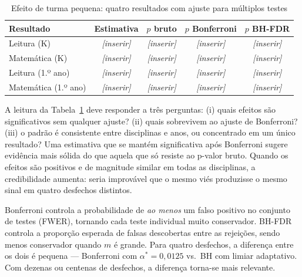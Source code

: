 \begin{table}[H]
\centering
\caption{Efeito de turma pequena: quatro resultados com ajuste para múltiplos testes}
\label{tab:multiplos_testes_star}
\begin{tabular}{lcccc}
\toprule
Resultado & Estimativa & $p$ bruto & $p$ Bonferroni & $p$ BH-FDR \\
\midrule
Leitura (K)          & \textit{[inserir]} & \textit{[inserir]} & \textit{[inserir]} & \textit{[inserir]} \\
Matemática (K)       & \textit{[inserir]} & \textit{[inserir]} & \textit{[inserir]} & \textit{[inserir]} \\
Leitura (1.º ano)    & \textit{[inserir]} & \textit{[inserir]} & \textit{[inserir]} & \textit{[inserir]} \\
Matemática (1.º ano) & \textit{[inserir]} & \textit{[inserir]} & \textit{[inserir]} & \textit{[inserir]} \\
\bottomrule
\end{tabular}

\vspace{4pt}
\end{table}

A leitura da Tabela~\ref{tab:multiplos_testes_star} deve responder a três perguntas: (i) quais efeitos são significativos sem qualquer ajuste? (ii) quais sobrevivem ao ajuste de Bonferroni? (iii) o padrão é consistente entre disciplinas e anos, ou concentrado em um único resultado? Uma estimativa que se mantém significativa após Bonferroni sugere evidência mais sólida do que aquela que só resiste ao p-valor bruto. Quando os efeitos são positivos e de magnitude similar em todas as disciplinas, a credibilidade aumenta: seria improvável que o mesmo viés produzisse o mesmo sinal em quatro desfechos distintos.

\begin{notabox}
Bonferroni controla a probabilidade de \textit{ao menos} um falso positivo no conjunto de testes (FWER), tornando cada teste individual muito conservador. BH-FDR controla a proporção esperada de falsas descobertas entre as rejeições, sendo menos conservador quando $m$ é grande. Para quatro desfechos, a diferença entre os dois é pequena --- Bonferroni com $\alpha^* = 0{,}0125$ vs.\ BH com limiar adaptativo. Com dezenas ou centenas de desfechos, a diferença torna-se mais relevante.
\end{notabox}


